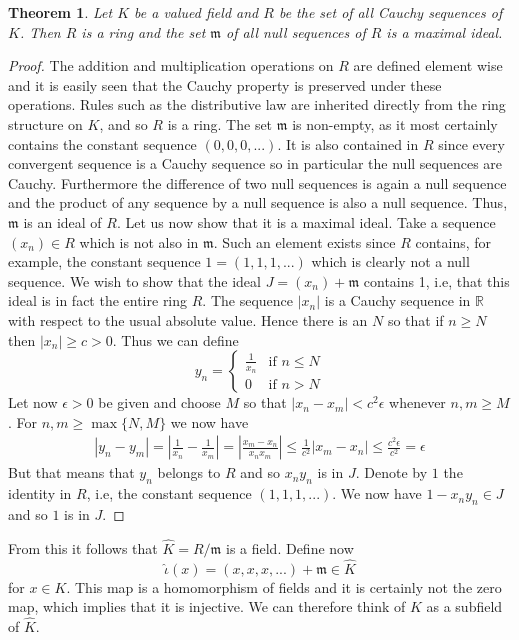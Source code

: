 \documentclass{article}
\newtheorem{theorem}{Theorem}[section]
\newcommand{\mfrak}[1]{\mathfrak{#1}}
\newcommand{\mbb}[1]{\mathbb{#1}}
\begin{document}
\begin{theorem}
    Let $K$ be a valued field and $R$ be the set of all Cauchy sequences of $K$. Then $R$ is a ring and the set $\mfrak m$ of all null sequences of $R$ is a maximal ideal.
\end{theorem}
\begin{proof}
    The addition and multiplication operations on $R$ are defined element wise and it is easily seen that the Cauchy property is preserved under these operations. Rules such as the distributive law are inherited directly from the ring structure on $K$, and so $R$ is a ring. The set $\mfrak m$ is non-empty, as it most certainly contains the constant sequence $(0,0,0,...)$. It is also contained in $R$ since every convergent sequence is a Cauchy sequence so in particular the null sequences are Cauchy. Furthermore the difference of two null sequences is again a null sequence and the product of any sequence by a null sequence is also a null sequence. Thus, $\mfrak m$ is an ideal of $R$. Let us now show that it is a maximal ideal. Take a sequence $(x_n) \in R$ which is not also in $\mfrak m$. Such an element exists since $R$ contains, for example, the constant sequence $1 = (1,1,1, ...)$ which is clearly not a null sequence. We wish to show that the ideal $J = (x_n) + \mfrak m$ contains 1, i.e, that this ideal is in fact the entire ring $R$. The sequence $|x_n|$ is a Cauchy sequence in $\mbb R$ with respect to the usual absolute value. Hence there is an $N$ so that if $n \geq N$ then $|x_n| \geq c > 0$. Thus we can define 
    $$y_n = \begin{cases} \frac{1}{x_n} & \text{if } n \leq N \\ 0 & \text{if } n > N \end{cases}$$
    Let now $\epsilon > 0$ be given and choose $M$ so that $|x_n - x_m| < c^2 \epsilon$ whenever $n,m \geq M$. For $n,m \geq \max\{N,M\}$ we now have
    \begin{align*}
        |y_n - y_m| = |\frac{1}{x_n} - \frac{1}{x_m}| = |\frac{x_m - x_n}{x_n x_m}| \leq \frac{1}{c^2} |x_m - x_n| \leq \frac{c^2 \epsilon}{c^2} = \epsilon
    \end{align*}
    But that means that $y_n$ belongs to $R$ and so $x_n y_n$ is in $J$. Denote by $1$ the identity in $R$, i.e, the constant sequence $(1,1,1, ...)$. We now have $1 - x_n y_n \in J$ and so $1$ is in $J$.
\end{proof}

From this it follows that $\hat K = R / \mfrak m$ is a field. Define now $$\hat \iota (x) = (x,x,x,...) + \mfrak m \in \hat K$$ for $x \in K$. This map is a homomorphism of fields and it is certainly not the zero map, which implies that it is injective. We can therefore think of $K$ as a subfield of $\hat K$. 
\end{document}

